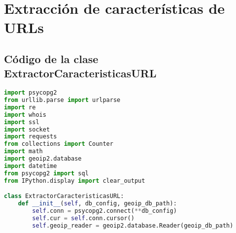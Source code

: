\documentclass{article}
\begin{document}
\section{Extracción de características de URLs}

\subsection{Código de la clase ExtractorCaracteristicasURL}

\begin{lstlisting}[language=Python, caption=Clase para extraer características de URLs]
import psycopg2
from urllib.parse import urlparse
import re
import whois
import ssl
import socket
import requests
from collections import Counter
import math
import geoip2.database
import datetime
from psycopg2 import sql
from IPython.display import clear_output

class ExtractorCaracteristicasURL:
    def __init__(self, db_config, geoip_db_path):
        self.conn = psycopg2.connect(**db_config)
        self.cur = self.conn.cursor()
        self.geoip_reader = geoip2.database.Reader(geoip_db_path)
        

\end{lstlisting}
\end{document}
